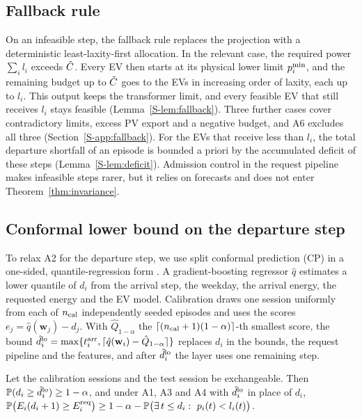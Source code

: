 \subsection{Fallback rule}\label{sec:fallback}

On an infeasible step, the fallback rule replaces the projection with a deterministic least-laxity-first allocation.
In the relevant case, the required power $\sum_il_i$ exceeds $\tilde C$.
Every EV then starts at its physical lower limit $p^{\min}_i$, and the remaining budget up to $\tilde C$ goes to the EVs in increasing order of laxity, each up to $l_i$.
This output keeps the transformer limit, and every feasible EV that still receives $l_i$ stays feasible (Lemma~\ref{S-lem:fallback}).
Three further cases cover contradictory limits, excess PV export and a negative budget, and A6 excludes all three (Section~\ref{S-app:fallback}).
For the EVs that receive less than $l_i$, the total departure shortfall of an episode is bounded a priori by the accumulated deficit of these steps (Lemma~\ref{S-lem:deficit}).
Admission control in the request pipeline makes infeasible steps rarer, but it relies on forecasts and does not enter Theorem~\ref{thm:invariance}.

\subsection{Conformal lower bound on the departure step}\label{sec:conformal}

To relax A2 for the departure step, we use split conformal prediction (CP) \cite{papadopoulos2002inductive,vovk2022algorithmic,lei2018distributionfree,angelopoulos2023conformal} in a one-sided, quantile-regression form \cite{romano2019conformalized}.
A gradient-boosting regressor $\hat q$ estimates a lower quantile of $d_i$ from the arrival step, the weekday, the arrival energy, the requested energy and the EV model.
Calibration draws one session uniformly from each of $n_{\mathrm{cal}}$ independently seeded episodes and uses the scores $e_j=\hat q(\mathbf w_j)-d_j$.
With $\hat Q_{1-\alpha}$ the $\lceil(n_{\mathrm{cal}}+1)(1-\alpha)\rceil$-th smallest score, the bound $\hat d_i^{\mathrm{lo}}=\max\{t_i^{\mathrm{arr}},\lceil\hat q(\mathbf w_i)-\hat Q_{1-\alpha}\rceil\}$ replaces $d_i$ in the bounds, the request pipeline and the features, and after $\hat d_i^{\mathrm{lo}}$ the layer uses one remaining step.

\begin{proposition}\label{prop:conformal}
Let the calibration sessions and the test session be exchangeable.
Then $\mathbb P(d_i\ge\hat d_i^{\mathrm{lo}})\ge1-\alpha$, and under A1, A3 and A4 with $\hat d_i^{\mathrm{lo}}$ in place of $d_i$, $\mathbb P\big(E_i(d_i+1)\ge E^{\mathrm{req}}_i\big)\ge1-\alpha-\mathbb P\big(\exists\,t\le d_i:\ p_i(t)<l_i(t)\big)$.
\end{proposition}

